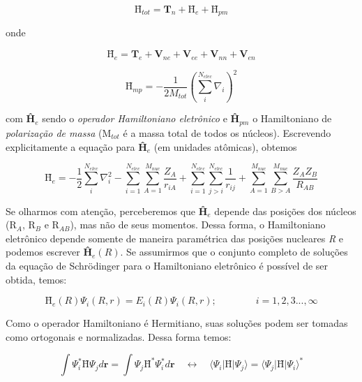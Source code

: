 	\begin{equation}
	\label{h_tot2}
	\textbf{\^H$_{tot}$} = \textbf{\^T$_{n}$} + \textbf{\^H$_{e}$} + \textbf{\^H$_{pm}$} 
	\end{equation}
	
	onde 
	
	\begin{equation}
	\label{he}
	\textbf{\^H$_{e}$} = \textbf{\^T$_{e}$} + \textbf{\^V$_{ne}$} + \textbf{\^V$_{ee}$} + \textbf{\^V$_{nn}$} + \textbf{\^V$_{en}$}
	\end{equation}
	
	\begin{equation}
	\label{hmp}
	\textbf{\^H$_{mp}$} = -\frac{1}{2M_{tot}} \left( \sum_{i}^{N_{elec}} \nabla_i \right)^2
	\end{equation}
	
	com \textbf{\^H$_{e}$} sendo o \textit{operador Hamiltoniano eletrônico} e \textbf{\^H$_{pm}$} o Hamiltoniano de \textit{polarização de massa} (M$_{tot}$ é a massa total de todos os núcleos). Escrevendo explicitamente a equação para \textbf{\^H$_{e}$}  (em unidades atômicas), obtemos
	
	\begin{equation}
	\label{he2}
	\textbf{\^H$_{e}$} = -\frac{1}{2} \sum_{i}^{N_{elec}} \nabla_i^2 -  \sum_{i=1}^{N_{elec}} \sum_{A=1}^{M_{nuc}} \frac{Z_A}{r_{iA}} +  \sum_{i=1}^{N_{elec}}  \sum_{j>i}^{N_{elec}} \frac{1}{r_{ij}} +  \sum_{A=1}^{M_{nuc}} \sum_{B>A}^{M_{nuc}} \frac{Z_{A}Z_{B}}{R_{AB}}
	\end{equation}
	
	Se olharmos com atenção, perceberemos que \textbf{\^H$_{e}$} depende das posições dos núcleos (R$_A$, R$_B$ e R$_{AB}$), mas não de seus momentos. Dessa forma, o Hamiltoniano eletrônico depende somente de maneira paramétrica das posições nucleares \textit{R} e podemos escrever \textbf{\^H$_{e}(R)$}. Se assumirmos que o conjunto completo de soluções da equação de Schrödinger para o Hamiltoniano eletrônico é possível de ser obtida, temos:
	
	\begin{equation}
	\label{schrodinger_ele}
	\textbf{\^H$_{e}(R)$}\Psi_{i}(R,r) = E_i(R)\Psi_i(R,r); \qquad \qquad i = 1,2,3...,\infty
	\end{equation}
	
	Como o operador Hamiltoniano é Hermitiano, suas soluções podem ser tomadas como ortogonais e normalizadas. Dessa forma temos:
	
	\begin{equation}
	\label{schrodinger_ele2}
	\int \Psi_i^\ast \textbf{\^H}\Psi_jd\textbf{r} = \int \Psi_j\textbf{\^H}^\ast\Psi_i^\ast d\textbf{r} \quad \leftrightarrow \quad \langle\Psi_i|\textbf{\^H}|\Psi_j\rangle = \langle\Psi_j|\textbf{\^H}|\Psi_i\rangle ^\ast
	\end{equation}
	
